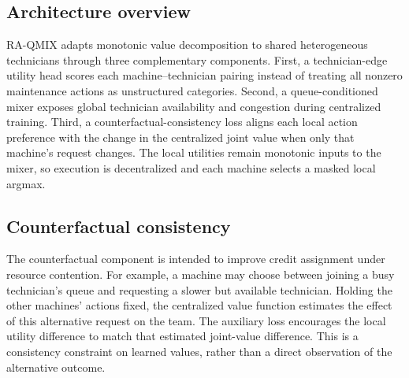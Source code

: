\documentclass[11pt]{article}
\begin{document}
\subsection{Architecture overview}

RA-QMIX adapts monotonic value decomposition to shared heterogeneous technicians through three complementary components. First, a technician-edge utility head scores each machine--technician pairing instead of treating all nonzero maintenance actions as unstructured categories. Second, a queue-conditioned mixer exposes global technician availability and congestion during centralized training. Third, a counterfactual-consistency loss aligns each local action preference with the change in the centralized joint value when only that machine's request changes. The local utilities remain monotonic inputs to the mixer, so execution is decentralized and each machine selects a masked local argmax.

\subsection{Counterfactual consistency}

The counterfactual component is intended to improve credit assignment under resource contention. For example, a machine may choose between joining a busy technician's queue and requesting a slower but available technician. Holding the other machines' actions fixed, the centralized value function estimates the effect of this alternative request on the team. The auxiliary loss encourages the local utility difference to match that estimated joint-value difference. This is a consistency constraint on learned values, rather than a direct observation of the alternative outcome.
\end{document}
